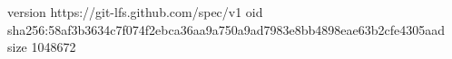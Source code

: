 version https://git-lfs.github.com/spec/v1
oid sha256:58af3b3634c7f074f2ebca36aa9a750a9ad7983e8bb4898eae63b2cfe4305aad
size 1048672
